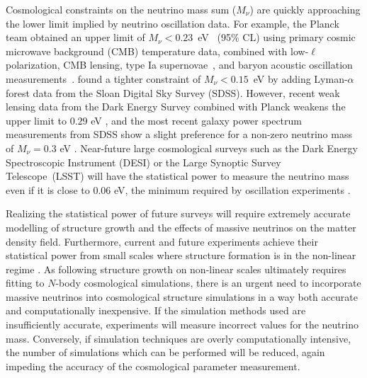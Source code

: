 \documentclass[useAMS, usenatbib]{mnras}
\begin{document}
Cosmological constraints on the neutrino mass sum ($M_\nu$) are quickly approaching the lower limit implied by neutrino oscillation data. For example, the Planck team obtained an upper limit of $M_\nu<0.23$~eV~\cite{planck2015xiii} (95\% CL)
using primary cosmic microwave background (CMB) temperature data, combined with low-$\ell$ polarization, CMB lensing, type Ia supernovae~\cite{Betoule_2014}, and baryon acoustic oscillation
measurements~\cite{Beutler_2011, Anderson_2014, Ross_2015}. \cite{Palanque_2015} found a tighter constraint of $M_\nu<0.15$~eV by adding Lyman-$\alpha$ forest data from the Sloan Digital Sky Survey (SDSS). However, recent weak lensing data from the Dark Energy Survey combined with Planck weakens the upper limit to $0.29$ eV \citep{DES_2017}, and the most recent galaxy power spectrum measurements from SDSS show a slight preference for a non-zero neutrino mass of $M_\nu = 0.3$ eV \citep{Beutler_2014}.
Near-future large cosmological surveys such as the Dark Energy Spectroscopic Instrument (DESI) \cite{DESI} or the
Large Synoptic Survey Telescope~(LSST) \cite{LSST, Joudaki_2012} will have the statistical power to measure the neutrino mass even if it is close to $0.06$ eV, the minimum required by oscillation experiments \citep{Abazajian_2015}.

Realizing the statistical power of future surveys will require extremely accurate modelling of structure growth and the effects of massive neutrinos on the matter density field.
Furthermore, current and future experiments achieve their statistical power from small scales where structure formation is in the non-linear regime \citep[e.g.~][]{Troxel_2017, HSC_2017}.
As following structure growth on non-linear scales ultimately requires fitting to $N$-body cosmological simulations, there is an urgent need to incorporate massive neutrinos into cosmological structure simulations
in a way both accurate and computationally inexpensive.
If the simulation methods used are insufficiently accurate, experiments will measure incorrect values for the neutrino mass.
Conversely, if simulation techniques are overly computationally intensive, the number of simulations which can be performed will be reduced, again impeding the accuracy of the cosmological parameter measurement.
\end{document}
